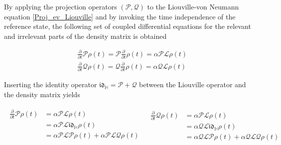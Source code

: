 \documentclass{homework}
\begin{document}
By applying the projection operators $(\bm{\mathcal{P}}, \bm{\mathcal{Q}})$ to the Liouville-von Neumann equation 
\cref{Proj_ev_Liouville} and by invoking the time independence of the reference state, the following set of coupled differential equations for the relevant and irrelevant parts of the density matrix is obtained

\begin{equation}
    \begin{split}
        &\frac{\partial}{\partial t} \bm{\mathcal{P}}\rho(t) = \bm{\mathcal{P}} \frac{\partial}{\partial t} \rho(t) = \alpha \bm{\mathcal{P}} \bm{\mathcal{L}} \rho(t) \\
        &\frac{\partial}{\partial t} \bm{\mathcal{Q}}\rho(t) = \bm{\mathcal{Q}} \frac{\partial}{\partial t} \rho(t) = \alpha \bm{\mathcal{Q}} \bm{\mathcal{L}} \rho(t) 
    \end{split}
\end{equation}

Inserting the identity operator $\mathfrak{i}\mathfrak{d}_{\mathds{H}} = \bm{\mathcal{P}} + \bm{\mathcal{Q}}$ between the Liouville operator and the density matrix yields

\begin{equation*}
\begin{array}{cc}
    \begin{split}
        \frac{\partial}{\partial t} \bm{\mathcal{P}}\rho(t) &= \alpha \bm{\mathcal{P}} \bm{\mathcal{L}} \rho(t) \\
        &= \alpha \bm{\mathcal{P}} \bm{\mathcal{L}} \mathfrak{i}\mathfrak{d}_{\mathds{H}} \rho(t) \\
        &= \alpha \bm{\mathcal{P}} \bm{\mathcal{L}} \bm{\mathcal{P}} \rho(t) + \alpha \bm{\mathcal{P}} \bm{\mathcal{L}} \bm{\mathcal{Q}} \rho(t) \\
    \end{split} & \begin{split}
        \frac{\partial}{\partial t} \bm{\mathcal{Q}}\rho(t) &= \alpha \bm{\mathcal{P}} \bm{\mathcal{L}} \rho(t) \\
        &= \alpha \bm{\mathcal{Q}} \bm{\mathcal{L}} \mathfrak{i}\mathfrak{d}_{\mathds{H}} \rho(t) \\
        &= \alpha \bm{\mathcal{Q}} \bm{\mathcal{L}} \bm{\mathcal{P}} \rho(t) + \alpha \bm{\mathcal{Q}} \bm{\mathcal{L}} \bm{\mathcal{Q}} \rho(t)
    \end{split}
    \label{Nakajima_Zwanzig_operators_diff_eqs}
\end{array}
\end{equation*}
\end{document}
